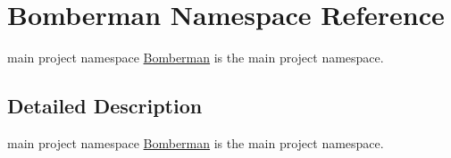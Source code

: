 \hypertarget{namespaceBomberman}{
\section{Bomberman Namespace Reference}
\label{namespaceBomberman}
}


main project namespace \hyperlink{namespaceBomberman}{Bomberman} is the main project namespace.  




\subsection{Detailed Description}
main project namespace \hyperlink{namespaceBomberman}{Bomberman} is the main project namespace. 